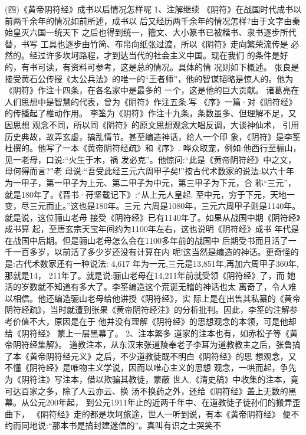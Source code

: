 \documentclass[12pt,UTF8]{ctexbook}
\begin{document}
(四)《黄帝阴符经》成书以后情况怎样呢
1、注解继续
《阴符》在战国时代成书以前两千余年的情况如前所述，成书以
后又经历两千余年的情况怎样?由于文字由秦始皇灭六国一统天下
之后也得到统一，籀文、大小篆书已被楷书、隶书逐步所代替，书写
工具也逐步由竹简、布帛向纸张过渡，所以《阴符》走向繁荣流传是
必然的。经过许多坎坷路程，才到达当代的社会主义中国。现在我们
的条件是好的，有书可读，有资料可参考，这是总的情况。具体的情
况则如下概述。
张良是接受黄石公传授《太公兵法》的唯一的“王者师”，他的智谋韬略是惊人的。他为《阴符》作注十四条，在各名家中是最多的
一个，这是他的巨大贡献。
诸葛亮在人们思想中是智慧的代表，曾为《阴符》作注五条.写
《序》一篇·对《阴符经》的传播起了椎动作用。
李筌为《阴符》作注十九条，条数虽多、但理解不足，又因思想
观念不同，所以同《阴符》的原文思想观念大唱反调，大谈神仙术，
引用历史典故，故弄玄虚，搞乱情节。甚至编造神话，给人一个印
象，《阴符》是李筌杜撰的。他写了一本《黄帝阴符经疏》和《序》.
哗众取宠，例如:他西行至骊山，见一老母，口说:“火生于木，祸
发必克”。他惊问:“此是《黄帝阴符经》中之文，母何得而言?”老
母说:“吾受此经三元六周甲子矣!”按古代术数家的说法:以六十年
为一甲子，第一甲子为上元、第二甲子为中元，第三甲子为下元，合
称“三元”，就是180年了。《晋书·苻坚载记下》:“从上元人皇起.
至中元，穷于下元，天地一变，尽三元而止。”这也是180年。三元
六周是1080年，三元六周甲子则是1140年。就是说，这位骊山老母
接受《阴符经》已有1140年了。如果从战国中期《阴符经》成书算
起，至唐玄宗天宝年间约为1100年左右，这也说明《阴符经》成书
年代是在战国中后期。但是骊山老母怎么会在1100多年前的战国中
后期受书而且活了一千一百多岁，以前活了多少岁还没有计算在内
呢!这当然是编造的神话。更奇怪的是:古代术数家还有一种说法:
4,617 年为一元,三元是13,851年,再加六周甲子360年,那就是14，
211年了。就是说:骊山老母在14,211年前就受领《阴符经》了，而
她活的岁数就不知道有多大了。李筌编造这个荒诞无稽的神话也太
离奇了，令人难以相信。他还编造骊山老母给他讲授《阴符经》，实
际上是在出售其私纂的《黄帝阴符经疏》，当时就遭到张果《黄帝阴符经注》的分析批判。因此，李筌的注解参考价值不大，原因是在于
他并没有理解《阴符经》的思想观念的本领，可是他却给《阴符经》
蒙上一层黑幕了。
2、注本繁多
道家的注本也有，如赤松子等《黄帝阴符经集解》。
道教注本，从东汉末张道陵奉老子李耳为道教教主之后，张鲁搞
了本《黄帝阴符经元义》之后，不少道教徒既不明白《阴符经》的思
想观念，又不懂《阴符经》是唯物主义学说，因而以唯心主义的思想
观念，一哄而起，争先为《阴符注》写注本，借以欺骗其教徒，蒙蔽
世人,《清史稿》中收集的注本，竟可达百家之多，除了人云亦云、换
汤不换药之外，还给《阴符经》盖上无数的黑幕。从公元200年起，
到公元1911年止的近两千年中、在道教徒子徒孙们的搬弄歪曲下，
《阴符经》走的都是坎坷旅途，世人一听到说，有本《黄帝阴符经》
便不约而同地说:“那本书是搞封建迷信的”。真叫有识之士哭笑不
\end{document}
